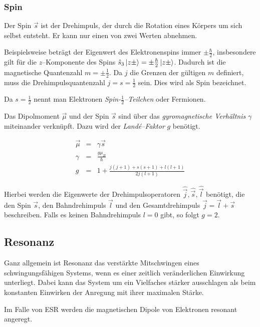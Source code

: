 \documentclass[12pt,a4paper]{scrartcl}
\numberwithin{equation}{section} %
\begin{document}
\hypertarget{spin}{%
\subsubsection{Spin}\label{spin}}

Der Spin $\vec s$ ist der Drehimpuls, der durch die Rotation eines
Körpers um sich selbst entsteht. Er kann nur einen von zwei Werten
abnehmen.

Beispielsweise beträgt der Eigenwert des Elektronenspins immer
$\pm\frac{\hbar}{2}$, insbesondere gilt für die $z$--Komponente des
Spins $\hat s_3\ket{z\pm}=\pm\frac{\hbar}{2}\ket{z\pm}$. Dadurch ist
die magnetische Quantenzahl $m=\pm\frac{1}{2}$. Da $j$ die Grenzen
der gültigen $m$ definiert, muss die Drehimpulsquantenzahl
$j=s=\frac{1}{2}$ sein. Dies wird als Spin bezeichnet.

Da $s=\frac{1}{2}$ nennt man Elektronen
\emph{Spin-$\frac{1}{2}$--Teilchen} oder Fermionen.

Das Dipolmoment $\vec \mu$ und der Spin $\vec s$ sind über das
\emph{gyromagnetische Verhältnis} $\gamma$ miteinander verknüpft. Dazu
wird der \emph{Landé--Faktor} $g$ benötigt.

\begin{eqnarray}
    \vec \mu &=& \gamma \vec{s} \\
    \gamma &=& \frac{g\mu_B}{\hbar} \\
    g &=& 1 + \frac{j(j+1) + s(s+1) + l(l+1)}{2j(l+1)}
\end{eqnarray}

Hierbei werden die Eigenwerte der Drehimpulsoperatoren
$\hat{\vec j},\hat{\vec s},\hat{\vec l}$ benötigt, die den Spin
$\vec s$, den Bahndrehimpuls $\vec l$ und den Gesamtdrehimpuls
$\vec j = \vec l + \vec s$ beschreiben. Falls es keinen Bahndrehimpuls
$l=0$ gibt, so folgt $g=2$.

\hypertarget{resonanz}{%
\subsection{Resonanz}\label{resonanz}}

Ganz allgemein ist Resonanz das verstärkte Mitschwingen eines
schwingungsfähigen Systems, wenn es einer zeitlich veränderlichen
Einwirkung unterliegt. Dabei kann das System um ein Vielfaches stärker
ausschlagen als beim konstanten Einwirken der Anregung mit ihrer
maximalen Stärke.

Im Falle von ESR werden die magnetischen Dipole von Elektronen resonant
angeregt.
\end{document}
